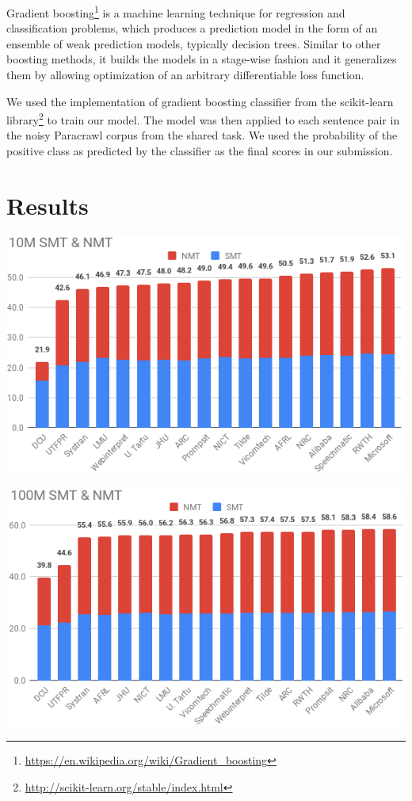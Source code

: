 \documentclass[a0]{sciposter}
\begin{document}
\begin{multicols*}{2}
Gradient boosting\footnote{\url{https://en.wikipedia.org/wiki/Gradient_boosting}} is a machine learning technique for regression and classification problems, which produces a prediction model in the form of an ensemble of weak prediction models, typically decision trees. Similar to other boosting methods, it builds the models in a stage-wise fashion and it generalizes them by allowing optimization of an arbitrary differentiable loss function.

We used the implementation of gradient boosting classifier from the scikit-learn library\footnote{\url{http://scikit-learn.org/stable/index.html}} to train our model. The model was then applied to each sentence pair in the noisy Paracrawl corpus from the shared task. We used the probability of the positive class as predicted by the classifier as the final scores in our submission.


\section*{\Large Results}

\includegraphics[width=\columnwidth]{assets/10M_crop.png}

\includegraphics[width=\columnwidth]{assets/100M_crop.png}



\end{multicols*}
\end{document}

